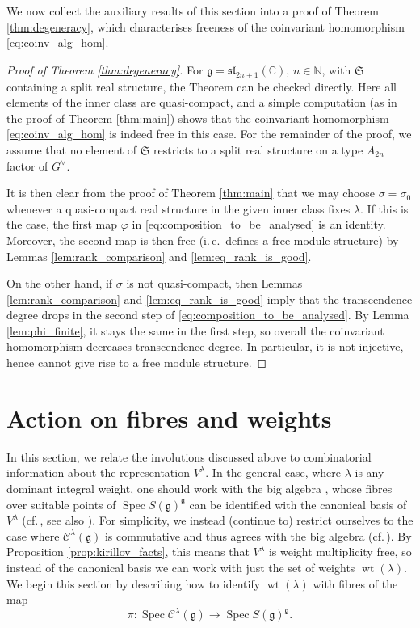 \documentclass{amsart}
\newcommand{\ie}{i.\,e.}
\newcommand{\cf}{cf.\,}
\newcommand{\C}{\mathbb{C}}
\newcommand{\Kir}{\mathcal{C}}
\newcommand{\g}{\mathfrak{g}}
\newcommand{\N}{\mathbb{N}}
\renewcommand{\sl}{\mathfrak{sl}}
\newcommand{\Spec}{\operatorname{Spec}}
\newcommand{\wt}{\operatorname{wt}}
\theoremstyle{definition}
\theoremstyle{plain}
\theoremstyle{remark}
\begin{document}
We now collect the auxiliary results of this section into a proof of Theorem \ref{thm:degeneracy}, which characterises freeness of the coinvariant homomorphism \eqref{eq:coinv_alg_hom}.
\begin{proof}[Proof of Theorem \ref{thm:degeneracy}]
    For $\g=\sl_{2n+1}(\C)$, $n\in \N$, with $\mathfrak{S}$ containing a split real structure, the Theorem can be checked directly. Here all elements of the inner class are quasi-compact, and a simple computation (as in the proof of Theorem \ref{thm:main}) shows that the coinvariant homomorphism \eqref{eq:coinv_alg_hom} is indeed free in this case. For the remainder of the proof, we assume that no element of $\mathfrak{S}$ restricts to a split real structure on a type $A_{2n}$ factor of $G^\vee$. 

    It is then clear from the proof of Theorem \ref{thm:main} that we may choose $\sigma = \sigma_0$ whenever a quasi-compact real structure in the given inner class fixes $\lambda$. If this is the case, the first map $\varphi$ in \eqref{eq:composition_to_be_analysed} is an identity. Moreover, the second map is then free (\ie\ defines a free module structure) by Lemmas \ref{lem:rank_comparison} and \ref{lem:eq_rank_is_good}.

    On the other hand, if $\sigma$ is not quasi-compact, then Lemmas \ref{lem:rank_comparison} and \ref{lem:eq_rank_is_good} imply that the transcendence degree drops in the second step of \eqref{eq:composition_to_be_analysed}. By Lemma \ref{lem:phi_finite}, it stays the same in the first step, so overall the coinvariant homomorphism decreases transcendence degree. In particular, it is not injective, hence cannot give rise to a free module structure.
\end{proof}

\section{Action on fibres and weights}
\label{sec:weight_action}
In this section, we relate the involutions discussed above to combinatorial information about the representation $V^\lambda$. In the general case, where $\lambda$ is any dominant integral weight, one should work with the big algebra \cite{Hausel2024_avatars}, whose fibres over suitable points of $\Spec S(\g)^\g$ can be identified with the canonical basis of $V^\lambda$ (\cf \cite[final slide]{Hausel2024_StonyBrook}, see also \cite{HKRW2020_crystals}). For simplicity, we instead (continue to) restrict ourselves to the case where $\Kir^\lambda(\g)$ is commutative and thus agrees with the big algebra (\cf \cite[Thm.2.1]{Hausel2024_avatars}).
By Proposition \ref{prop:kirillov_facts}, this means that $V^\lambda$ is weight multiplicity free, so instead of the canonical basis we can work with just the set of weights $\wt(\lambda)$. We begin this section by describing how to identify $\wt(\lambda)$ with fibres of the map
\begin{equation}
\label{eq:Kirillov_Spec_projection}
    \pi \colon
    \Spec\Kir^\lambda(\g)
    \to
    \Spec S(\g)^\g.
\end{equation}
\end{document}
